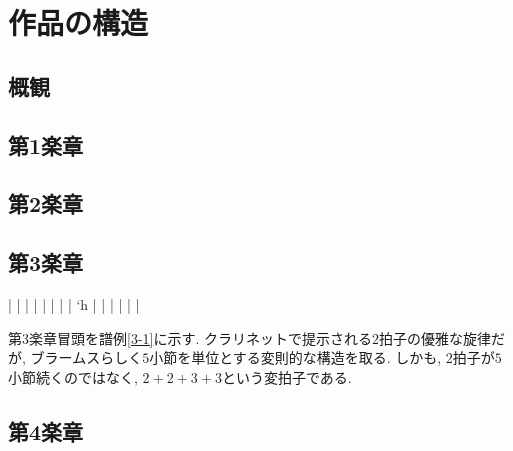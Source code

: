 
\chapter{作品の構造}

\section{概観}

\section{第1楽章}

\section{第2楽章}

\section{第3楽章}

\musicbegin
	\def\nbinstruments{1}%
	\startextract%
		\Notes\cmidstaff{\p}|
			\enotes
		\Notes{}|
			\enotes
		\bar
		\NOtes{}|
			\enotes
		\bar
		\NOtes{}|
			\enotes
		\bar
		\Notes{}|
			\lq{h}\enotes
		\Notes{}|
			\enotes
		\bar
		\Notes{}|
			\enotes
		\Notes{}|
			\enotes
		\Notes{}|
			\enotes
		\Notes{}|
			\enotes
	\endextract %

第3楽章冒頭を譜例\ref{3-1}に示す. クラリネットで提示される$2$拍子の優雅な旋律だが,
ブラームスらしく$5$小節を単位とする変則的な構造を取る.
しかも, $2$拍子が$5$小節続くのではなく, $2 + 2 + 3 + 3$という変拍子である. 


\section{第4楽章}
